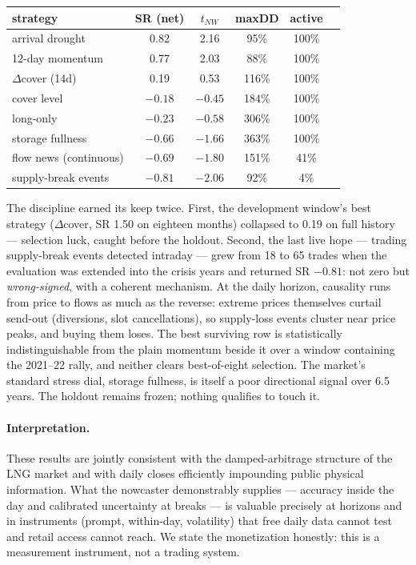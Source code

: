 \documentclass[11pt]{article}
\begin{document}
\begin{center}\small
\begin{tabular}{lccccc}
\toprule
strategy & SR (net) & $t_{NW}$ & maxDD & active \\
\midrule
arrival drought & 0.82 & 2.16 & 95\% & 100\% \\
12-day momentum & 0.77 & 2.03 & 88\% & 100\% \\
$\Delta$cover (14d) & 0.19 & 0.53 & 116\% & 100\% \\
cover level & $-0.18$ & $-0.45$ & 184\% & 100\% \\
long-only & $-0.23$ & $-0.58$ & 306\% & 100\% \\
storage fullness & $-0.66$ & $-1.66$ & 363\% & 100\% \\
flow news (continuous) & $-0.69$ & $-1.80$ & 151\% & 41\% \\
supply-break events & $-0.81$ & $-2.06$ & 92\% & 4\% \\
\bottomrule
\end{tabular}
\end{center}

\noindent The discipline earned its keep twice. First, the development
window's best strategy ($\Delta$cover, SR 1.50 on eighteen months)
collapsed to 0.19 on full history --- selection luck, caught before the
holdout. Second, the last live hope --- trading supply-break events
detected intraday --- grew from 18 to 65 trades when the evaluation was
extended into the crisis years and returned SR $-0.81$: not zero but
\emph{wrong-signed}, with a coherent mechanism. At the daily horizon,
causality runs from price to flows as much as the reverse: extreme prices
themselves curtail send-out (diversions, slot cancellations), so
supply-loss events cluster near price peaks, and buying them loses. The
best surviving row is statistically indistinguishable from the plain
momentum beside it over a window containing the 2021--22 rally, and
neither clears best-of-eight selection. The market's standard stress
dial, storage fullness, is itself a poor directional signal over 6.5
years. The holdout remains frozen; nothing qualifies to touch it.

\paragraph{Interpretation.} These results are jointly consistent with the
damped-arbitrage structure of the LNG market
\cite{arbitrage2014,realoption2020} and with daily closes efficiently
impounding public physical information. What the nowcaster demonstrably
supplies --- accuracy inside the day and calibrated uncertainty at
breaks --- is valuable precisely at horizons and in instruments (prompt,
within-day, volatility) that free daily data cannot test and retail
access cannot reach. We state the monetization honestly: this is a
measurement instrument, not a trading system.
\end{document}
